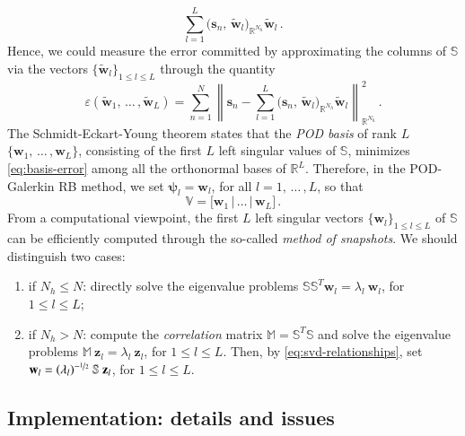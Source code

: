 \documentclass[longtitle]{elsarticle}
\numberwithin{equation}{section}
\theoremstyle{theorem}
\theoremstyle{definition}
\theoremstyle{remark}
\theoremstyle{proposition}
\numberwithin{figure}{section}
\newcommand{\norm}[1]{\left\lVert#1\right\rVert}
\newcommand{\wt}[1]{\widetilde{#1}}
\newcommand{\bg}[1]{\boldsymbol{#1}}
\begin{document}
		\begin{equation*}
			\sum_{l = 1}^L \big( \mathbf{s}_n, \, \wt{\mathbf{w}}_l \big)_{\mathbb{R}^{N_h}} \wt{\mathbf{w}}_l \, .
		\end{equation*} 
		Hence, we could measure the error committed by approximating the columns of $\mathbb{S}$ via the vectors $\big\lbrace \wt{\mathbf{w}}_l \big\rbrace_{1 \leq l \leq L}$ through the quantity
		\begin{equation}
			\label{eq:basis-error}
			\varepsilon(\wt{\mathbf{w}}_1, \, \ldots \, , \wt{\mathbf{w}}_L) = \sum_{n = 1}^N \norm{\mathbf{s}_n - \sum_{l = 1}^L \big( \mathbf{s}_n, \, \wt{\mathbf{w}}_l \big)_{\mathbb{R}^{N_h}} \wt{\mathbf{w}}_l}_{\mathbb{R}^{N_h}}^2 \, .
		\end{equation}
		The Schmidt-Eckart-Young theorem \cite{EY36, Sch07} states that the \emph{POD basis} of rank $L$ $\big\lbrace \mathbf{w}_1, \, \ldots \, , \mathbf{w}_L \big\rbrace$, consisting of the first $L$ left singular values of $\mathbb{S}$, minimizes \eqref{eq:basis-error} among all the orthonormal bases of $\mathbb{R}^L$. Therefore, in the POD-Galerkin RB method, we set $\bg{\psi}_l = \mathbf{w}_l$, for all $l = 1, \, \ldots \, , L$, so that
		\begin{equation*}
			\mathbb{V} = \big[ \mathbf{w}_1 \, \big| \, \ldots \, \big| \, \mathbf{w}_L \big] \, . 		
		\end{equation*}
		From a computational viewpoint, the first $L$ left singular vectors $\big\lbrace \mathbf{w}_l \big\rbrace_{1 \leq l \leq L}$ of $\mathbb{S}$ can be efficiently computed through the so-called \emph{method of snapshots}. We should distinguish two cases:
		\begin{enumerate}[label=(\alph*)]
			\item if ${N_h} \leq N$: directly solve the eigenvalue problems $\mathbb{S} \mathbb{S}^T \mathbf{w}_l = \lambda_l ~ \mathbf{w}_l$, for $1 \leq l \leq L$;
			\item if ${N_h} > N$: compute the \emph{correlation} matrix $\mathbb{M} = \mathbb{S}^T \mathbb{S}$ and solve the eigenvalue problems $\mathbb{M} ~ \mathbf{z}_l = \lambda_l ~ \mathbf{z}_l$, for $1 \leq l \leq L$. Then, by \eqref{eq:svd-relationships}, set $\mathbf{w}_l = (\lambda_l)^{-\nicefrac{1}{2}} ~ \mathbb{S} ~ \mathbf{z}_l$, for $1 \leq l \leq L$.
		\end{enumerate}
		
			
	
	\subsection{Implementation: details and issues}
	\label{section:Implementation: details and issues}
	
\end{document}
